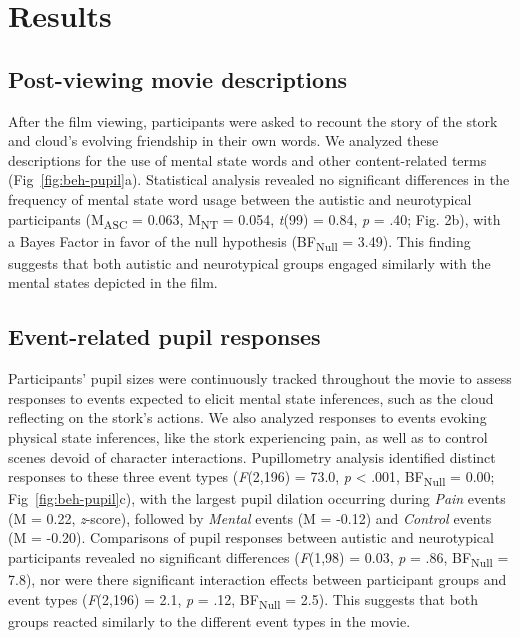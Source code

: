 \section{Results}
\subsection{Post-viewing movie descriptions }
After the film viewing, participants were asked to recount the story of the stork and cloud's evolving friendship in their own words. We analyzed these descriptions for the use of mental state words and other content-related terms (Fig~\ref{fig:beh-pupil}a). Statistical analysis revealed no significant differences in the frequency of mental state word usage between the autistic and neurotypical participants (M\textsubscript{ASC} = 0.063, M\textsubscript{NT} = 0.054, \textit{t}(99) = 0.84, \textit{p} = .40; Fig. 2b), with a Bayes Factor in favor of the null hypothesis (BF\textsubscript{Null} = 3.49). This finding suggests that both autistic and neurotypical groups engaged similarly with the mental states depicted in the film.



\subsection{Event-related pupil responses}
Participants' pupil sizes were continuously tracked throughout the movie to assess responses to events expected to elicit mental state inferences, such as the cloud reflecting on the stork's actions. We also analyzed responses to events evoking physical state inferences, like the stork experiencing pain, as well as to control scenes devoid of character interactions. Pupillometry analysis identified distinct responses to these three event types (\textit{F}(2,196) = 73.0, \textit{p} < .001, BF\textsubscript{Null} = 0.00; Fig~\ref{fig:beh-pupil}c), with the largest pupil dilation occurring during \textit{Pain} events (M = 0.22, \textit{z}-score), followed by \textit{Mental} events (M = -0.12) and \textit{Control} events (M = -0.20). Comparisons of pupil responses between autistic and neurotypical participants revealed no significant differences (\textit{F}(1,98) = 0.03, \textit{p} = .86, BF\textsubscript{Null} = 7.8), nor were there significant interaction effects between participant groups and event types (\textit{F}(2,196) = 2.1, \textit{p} = .12, BF\textsubscript{Null} = 2.5). This suggests that both groups reacted similarly to the different event types in the movie.

